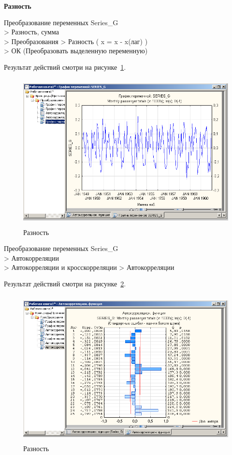 
\newpage

\begin{center}
  \textbf{Разность}
\end{center}

Преобразование переменных Series\_G\\
> Разность, сумма\\
> Преобразования  > Разность ( x = x - x(лаг) )\\
> ОК (Преобразовать выделенную переменную)

Результат действий смотри на рисунке~\ref{fig:6}.

\begin{figure}[!h]
  \centering

  \includegraphics[height=8cm]
  {inc/6.PNG}

  \caption{Разность}

  \label{fig:6}
\end{figure}

Преобразование переменных Series\_G\\
> Автокорреляции\\
> Автокорреляции и кросскорреляции > Автокорреляции

Результат действий смотри на рисунке~\ref{fig:7}.

\begin{figure}[!h]
  \centering

  \includegraphics[height=8cm]
  {inc/7.PNG}

  \caption{Разность}

  \label{fig:7}
\end{figure}

